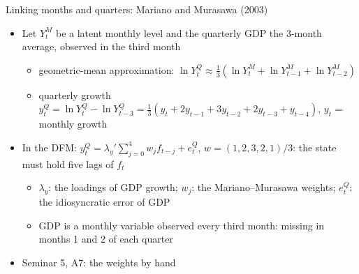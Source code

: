 \begin{frame}{Linking months and quarters: Mariano and Murasawa (2003)}
\itemsize{\small}
\begin{itemize}
    \item Let $Y_t^M$ be a latent monthly level and the quarterly GDP the 3-month average, observed in the third month
    \begin{itemize}
        \item geometric-mean approximation: $\ln Y_t^Q \approx \frac13(\ln Y_t^M + \ln Y_{t-1}^M + \ln Y_{t-2}^M)$
        \item quarterly growth $y_t^Q = \ln Y_t^Q - \ln Y_{t-3}^Q = \frac13(y_t + 2y_{t-1} + 3y_{t-2} + 2y_{t-3} + y_{t-4})$, $y_t$ = monthly growth 
    \end{itemize}
    \item In the DFM: $y_t^Q = \lambda_y'\sum_{j=0}^{4}w_jf_{t-j} + e_t^Q$, $w = (1, 2, 3, 2, 1)/3$: the state must hold five lags of $f_t$
    \begin{itemize}
        \item $\lambda_y$: the loadings of GDP growth; $w_j$: the Mariano--Murasawa weights; $e_t^Q$: the idiosyncratic error of GDP
        \item GDP is a monthly variable observed every third month: missing in months 1 and 2 of each quarter
    \end{itemize}
    \item Seminar 5, A7: the weights by hand
\end{itemize}
\end{frame}

